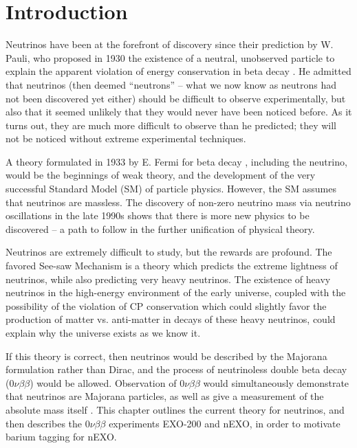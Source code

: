 \chapter{Introduction}

Neutrinos have been at the forefront of discovery since their prediction by W. Pauli, who proposed in 1930 the existence of a neutral, unobserved particle to explain the apparent violation of energy conservation in beta decay \cite{betaspectrum}. He admitted that neutrinos (then deemed ``neutrons'' -- what we now know as neutrons had not been discovered yet either) should be difficult to observe experimentally, but also that it seemed unlikely that they would never have been noticed before.  As it turns out, they are much more difficult to observe than he predicted; they will not be noticed without extreme experimental techniques.

A theory formulated in 1933 by E. Fermi for beta decay \cite{FermiBetaDecay}, including the neutrino, would be the beginnings of weak theory, and the development of the very successful Standard Model (SM) of particle physics.  However, the SM assumes that neutrinos are massless.  The discovery of non-zero neutrino mass via neutrino oscillations in the late 1990s \cite{SuperK} shows that there is more new physics to be discovered -- a path to follow in the further unification of physical theory.

Neutrinos are extremely difficult to study, but the rewards are profound.  The favored See-saw Mechanism is a theory which predicts the extreme lightness of neutrinos, while also predicting very heavy neutrinos.  The existence of heavy neutrinos in the high-energy environment of the early universe, coupled with the possibility of the violation of CP conservation which could slightly favor the production of matter vs. anti-matter in decays of these heavy neutrinos, could explain why the universe exists as we know it.  
\cite{SeeSaw}

If this theory is correct, then neutrinos would be described by the Majorana formulation rather than Dirac, and the process of neutrinoless double beta decay ($0\nu\beta\beta$) would be allowed.  Observation of $0\nu\beta\beta$ would simultaneously demonstrate that neutrinos are Majorana particles, as well as give a measurement of the absolute mass itself \cite{effectiveMass}.  This chapter outlines the current theory for neutrinos, and then describes the $0\nu\beta\beta$ experiments EXO-200 and nEXO, in order to motivate barium tagging for nEXO.

